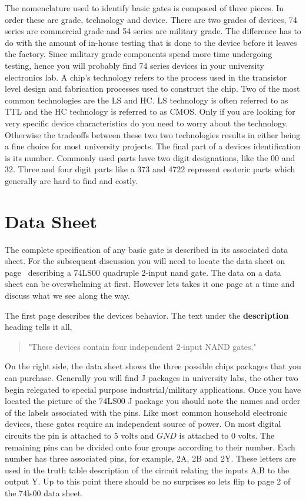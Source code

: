 The nomenclature used to identify basic gates  is
composed of three pieces.  In order these are grade, technology and
device.  There are two grades of devices, 74 series are commercial
grade and 54 series are military grade.  The difference has to do 
with the amount of in-house testing that is done to the device before
it leaves the factory.  Since military grade components spend more 
time undergoing testing, hence you will
probably find 74 series devices in your university electronics
lab.  A chip's technology refers to the process used in the transistor
level design and fabrication processes used to construct the chip.
Two of the most common technologies are the LS and HC.  LS technology 
is often referred to as TTL and the HC technology is referred to as 
CMOS.  Only if you are looking for very specific device characteristics
do you need to worry about the technology.  Otherwise the tradeoffs 
between these two two technologies results in either being a fine 
choice for most university projects.  The final part of a 
devices identification is its number.  Commonly used parts have two 
digit designations, like the 00 and 32.  Three and four digit parts 
like a 373 and 4722 represent esoteric parts which generally are hard 
to find and costly.

\section{Data Sheet}
The complete specification of any basic gate is described in its
associated data sheet.  For the subsequent discussion you
will need to locate the data sheet on page~\pageref{page:74ls00} 
describing a 74LS00 quadruple 2-input nand gate.
The data on a data sheet can be overwhelming at first.  However lets
takes it one page at a time and discuss what we see along the way.

The first page describes the devices behavior.  The text under
the {\bf description} heading tells it all,
\begin{quote}
	"These devices contain four independent 2-input NAND gates."
\end{quote}
On the right side, the data sheet shows the three possible
chips packages that you can purchase.
Generally you will find J packages in university labs, the other two
begin relegated to special purpose industrial/military applications.
Once you have located the picture of the 74LS00 J package you should
note the names and order of the labels associated with the pins.  Like
most common household electronic devices, these gates require an
independent source of power.  On most digital circuits the \VCC pin
is attached to 5 volts and $GND$ is attached to 0 volts.  The remaining
pins can be divided onto four groups according to their number.  Each
number has three associated pins, for example, 2A, 2B and 2Y.  These
letters are used in the truth table description of the circuit relating the
inputs A,B to the output Y.  Up to this point there should be no surprises
so lets flip to page 2 of the 74ls00 data sheet.

